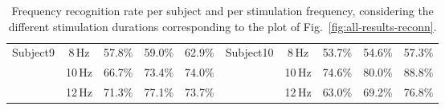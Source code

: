 \documentclass[smallextended]{svjour3}
\begin{document}
\begin{table}[ht]
\begin{center}
\begin{tabular}{ r | c | c | c | c || r | c | c | c | c }
        \hline

        \multirow{3}{*}{Subject9} &  8\,Hz & 57.8\% & 59.0\% & 62.9\% & \multirow{3}{*}{Subject10} &  8\,Hz & 53.7\% & 54.6\% & 57.3\% \\
                                  & 10\,Hz & 66.7\% & 73.4\% & 74.0\% & & 10\,Hz & 74.6\% & 80.0\% & 88.8\% \\
                                  & 12\,Hz & 71.3\% & 77.1\% & 73.7\% & & 12\,Hz & 63.0\% & 69.2\% & 76.8\% \\

        \hline
                                  

    \end{tabular}
    \caption{Frequency recognition rate per subject and per stimulation frequency, considering the different stimulation durations corresponding to the plot of Fig.~\ref{fig:all-results-reconn}.}
\label{tab:all-results-reconn}
\end{center}\end{table}
\end{document}

